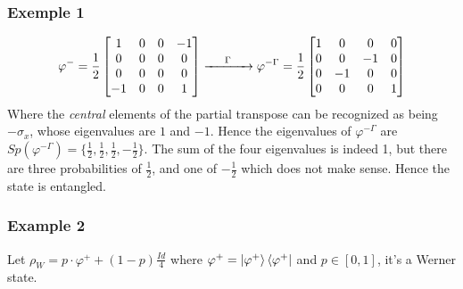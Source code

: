 \documentclass{article}
\begin{document}
\subsubsection*{Exemple 1}
\begin{equation}
    \varphi^- = \frac{1}{2}\begin{bmatrix}
        1 & 0 & 0 &-1 \\
        0 & 0 & 0 & 0 \\
        0 & 0 & 0 & 0 \\
       -1 & 0 & 0 & 1
    \end{bmatrix}
    \xrightarrow{\hspace*{0.5cm}\Gamma\hspace*{0.5cm}}
    \varphi^{-\Gamma} = \frac{1}{2}\begin{bmatrix}
        1 & 0 & 0 & 0 \\
        0 & 0 & -1 & 0 \\
        0 & -1 & 0 & 0 \\
        0 & 0 & 0 & 1
    \end{bmatrix}
\end{equation}
Where the \textit{central} elements of the partial transpose can be recognized
as being $-\sigma_x$, whose eigenvalues are $1$ and $-1$. Hence the eigenvalues of
$\varphi^{-\Gamma}$ are
$Sp(\varphi^{-\Gamma})=\{\frac{1}{2},\frac{1}{2},\frac{1}{2},-\frac{1}{2}\}$. The
sum of the four eigenvalues is indeed 1, but there are three probabilities of
$\frac{1}{2}$, and one of $-\frac{1}{2}$ which does not make sense. Hence the
state is entangled.

\subsubsection*{Example 2}
Let $\rho_W = p\cdot\varphi^+ + (1-p) \frac{Id}{4}$ where
$\varphi^+ = \ket{\varphi^+} \bra{\varphi^+}$ and $p\in [0, 1]$, it's a Werner state.
\end{document}
